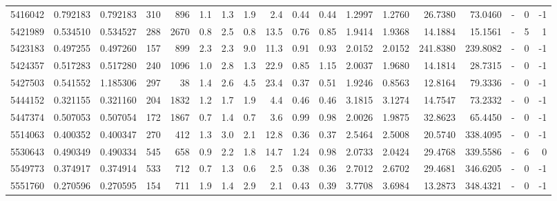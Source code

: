 \begin{tabular}{rrrrrrrrrrrrrrrlrr}
   5416042 & 0.792183 &   0.792183 &  310 &  896 &      1.1 &      1.3 &     1.9 &      2.4 &       0.44 &        0.44 &  1.2997 &  1.2760 &   26.7380 &   73.0460 &             - &        0 &         -1 \\
   5421989 & 0.534510 &   0.534527 &  288 & 2670 &      0.8 &      2.5 &     0.8 &     13.5 &       0.76 &        0.85 &  1.9414 &  1.9368 &   14.1884 &   15.1561 &             - &        5 &          1 \\
   5423183 & 0.497255 &   0.497260 &  157 &  899 &      2.3 &      2.3 &     9.0 &     11.3 &       0.91 &        0.93 &  2.0152 &  2.0152 &  241.8380 &  239.8082 &             - &        0 &         -1 \\
   5424357 & 0.517283 &   0.517280 &  240 & 1096 &      1.0 &      2.8 &     1.3 &     22.9 &       0.85 &        1.15 &  2.0037 &  1.9680 &   14.1814 &   28.7315 &             - &        0 &         -1 \\
   5427503 & 0.541552 &   1.185306 &  297 &   38 &      1.4 &      2.6 &     4.5 &     23.4 &       0.37 &        0.51 &  1.9246 &  0.8563 &   12.8164 &   79.3336 &             - &        0 &         -1 \\
   5444152 & 0.321155 &   0.321160 &  204 & 1832 &      1.2 &      1.7 &     1.9 &      4.4 &       0.46 &        0.46 &  3.1815 &  3.1274 &   14.7547 &   73.2332 &             - &        0 &         -1 \\
   5447374 & 0.507053 &   0.507054 &  172 & 1867 &      0.7 &      1.4 &     0.7 &      3.6 &       0.99 &        0.98 &  2.0026 &  1.9875 &   32.8623 &   65.4450 &             - &        0 &         -1 \\
   5514063 & 0.400352 &   0.400347 &  270 &  412 &      1.3 &      3.0 &     2.1 &     12.8 &       0.36 &        0.37 &  2.5464 &  2.5008 &   20.5740 &  338.4095 &             - &        0 &         -1 \\
   5530643 & 0.490349 &   0.490334 &  545 &  658 &      0.9 &      2.2 &     1.8 &     14.7 &       1.24 &        0.98 &  2.0733 &  2.0424 &   29.4768 &  339.5586 &             - &        6 &          0 \\
   5549773 & 0.374917 &   0.374914 &  533 &  712 &      0.7 &      1.3 &     0.6 &      2.5 &       0.38 &        0.36 &  2.7012 &  2.6702 &   29.4681 &  346.6205 &             - &        0 &         -1 \\
   5551760 & 0.270596 &   0.270595 &  154 &  711 &      1.9 &      1.4 &     2.9 &      2.1 &       0.43 &        0.39 &  3.7708 &  3.6984 &   13.2873 &  348.4321 &             - &        0 &         -1 \\

\end{tabular}
